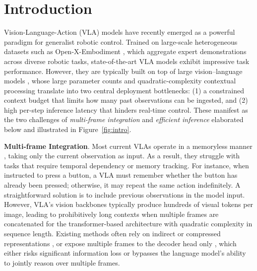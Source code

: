 \section{Introduction}

Vision-Language-Action (VLA) models \citep{li2024cogact,kim2024openvla,qu2025spatialvla,kim2025fine,zhu2024surveymodelcompressionlarge,zhong2025surveyvisionlanguageactionmodelsaction,black2024pi0visionlanguageactionflowmodel,intelligence2025pi05visionlanguageactionmodelopenworld} have recently emerged as a powerful paradigm for generalist robotic control. Trained on large-scale heterogeneous datasets such as Open-X-Embodiment \citep{vuong2023open}, which aggregate expert demonstrations across diverse robotic tasks, state-of-the-art VLA models exhibit impressive task performance. However, they are typically built on top of large vision–language models \citep{liu2023visual,karamcheti2024prismatic,beyer2024paligemma,steiner2024paligemma}, whose large parameter counts and quadratic-complexity contextual processing \citep{vaswani2017attention} translate into two central deployment bottlenecks: (1) a constrained context budget that limits how many past observations can be ingested, and (2) high per-step inference latency that hinders real-time control. These manifest as the two challenges of \emph{multi-frame integration} and \emph{efficient inference} elaborated below and illustrated in Figure~\ref{fig:intro}.

\noindent\textbf{Multi-frame Integration}. Most current VLAs operate in a memoryless manner \citep{kim2024openvla,li2024cogact,qu2025spatialvla}, taking only the current observation as input. As a result, they struggle with tasks that require temporal dependency or memory tracking. For instance, when instructed to press a button, a VLA must remember whether the button has already been pressed; otherwise, it may repeat the same action indefinitely. A straightforward solution is to include previous observations in the model input. However, VLA's vision backbones typically produce hundreds of visual tokens per image, leading to prohibitively long contexts when multiple frames are concatenated for the transformer-based architecture with quadratic complexity in sequence length. Existing methods often rely on indirect or compressed representations \citep{jang2025contextvla,torne2026mem}, or expose multiple frames to the decoder head only \citep{shi2025memoryvlaperceptualcognitivememoryvisionlanguageaction}, which either risks significant information loss or bypasses the language model’s ability to jointly reason over multiple frames.

